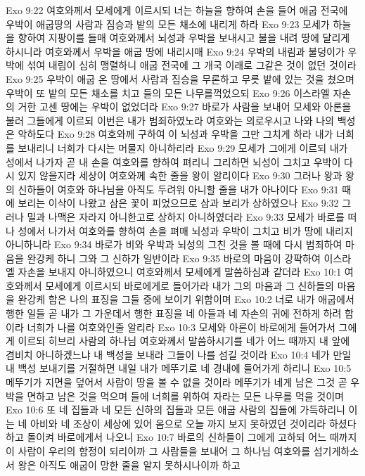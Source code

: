 Exo 9:22  여호와께서 모세에게 이르시되 너는 하늘을 향하여 손을 들어 애굽 전국에 우박이 애굽땅의 사람과 짐승과 밭의 모든 채소에 내리게 하라
Exo 9:23  모세가 하늘을 향하여 지팡이를 들매 여호와께서 뇌성과 우박을 보내시고 불을 내려 땅에 달리게 하시니라 여호와께서 우박을 애굽 땅에 내리시매
Exo 9:24  우박의 내림과 불덩이가 우박에 섞여 내림이 심히 맹렬하니 애굽 전국에 그 개국 이래로 그같은 것이 없던 것이라
Exo 9:25  우박이 애굽 온 땅에서 사람과 짐승을 무론하고 무릇 밭에 있는 것을 쳤으며 우박이 또 밭의 모든 채소를 치고 들의 모든 나무를꺽었으되
Exo 9:26  이스라엘 자손의 거한 고센 땅에는 우박이 없었더라
Exo 9:27  바로가 사람을 보내어 모세와 아론을 불러 그들에게 이르되 이번은 내가 범죄하였노라 여호와는 의로우시고 나와 나의 백성은 악하도다
Exo 9:28  여호와께 구하여 이 뇌성과 우박을 그만 그치게 하라 내가 너희를 보내리니 너희가 다시는 머물지 아니하리라
Exo 9:29  모세가 그에게 이르되 내가 성에서 나가자 곧 내 손을 여호와를 향하여 펴리니 그리하면 뇌성이 그치고 우박이 다시 있지 않을지라 세상이 여호와께 속한 줄을 왕이 알리이다
Exo 9:30  그러나 왕과 왕의 신하들이 여호와 하나님을 아직도 두려워 아니할 줄을 내가 아나이다
Exo 9:31  때에 보리는 이삭이 나왔고 삼은 꽃이 피었으므로 삼과 보리가 상하였으나
Exo 9:32  그러나 밀과 나맥은 자라지 아니한고로 상하지 아니하였더라
Exo 9:33  모세가 바로를 떠나 성에서 나가서 여호와를 향하여 손을 펴매 뇌성과 우박이 그치고 비가 땅에 내리지 아니하니라
Exo 9:34  바로가 비와 우박과 뇌성의 그친 것을 볼 때에 다시 범죄하여 마음을 완강케 하니 그와 그 신하가 일반이라
Exo 9:35  바로의 마음이 강퍅하여 이스라엘 자손을 보내지 아니하였으니 여호와께서 모세에게 말씀하심과 같더라
Exo 10:1  여호와께서 모세에게 이르시되 바로에게로 들어가라 내가 그의 마음과 그 신하들의 마음을 완강케 함은 나의 표징을 그들 중에 보이기 위함이며
Exo 10:2  너로 내가 애굽에서 행한 일들 곧 내가 그 가운데서 행한 표징을 네 아들과 네 자손의 귀에 전하게 하려 함이라 너희가 나를 여호와인줄 알리라
Exo 10:3  모세와 아론이 바로에게 들어가서 그에게 이르되 히브리 사람의 하나님 여호와께서 말씀하시기를 네가 어느 때까지 내 앞에 겸비치 아니하겠느냐 내 백성을 보내라 그들이 나를 섬길 것이라
Exo 10:4  네가 만일 내 백성 보내기를 거절하면 내일 내가 메뚜기로 네 경내에 들어가게 하리니
Exo 10:5  메뚜기가 지면을 덮어서 사람이 땅을 볼 수 없을 것이라 메뚜기가 네게 남은 그것 곧 우박을 면하고 남은 것을 먹으며 들에 너희를 위하여 자라는 모든 나무를 먹을 것이며
Exo 10:6  또 네 집들과 네 모든 신하의 집들과 모든 애굽 사람의 집들에 가득하리니 이는 네 아비와 네 조상이 세상에 있어 옴으로 오늘 까지 보지 못하였던 것이리라 하셨다 하고 돌이켜 바로에게서 나오니
Exo 10:7  바로의 신하들이 그에게 고하되 어느 때까지 이 사람이 우리의 함정이 되리이까 그 사람들을 보내어 그 하나님 여호와를 섬기게하소서 왕은 아직도 애굽이 망한 줄을 알지 못하시나이까 하고
